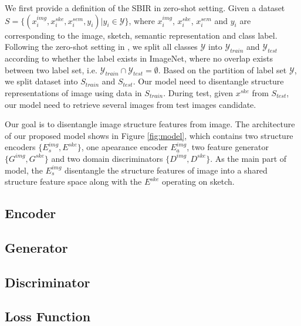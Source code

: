 \documentclass[10pt,twocolumn,letterpaper]{article}
\begin{document}
We first provide a definition of the SBIR in zero-shot setting. Given a dataset $S=\{(x_i^{img}, x_i^{ske}, x_i^{sem}, y_i)|y_i \in \mathcal{Y}\}$, where $x_i^{img}$, $x_i^{ske}$, $x_i^{sem}$ and $y_i$ are corresponding to the image, sketch, semantic representation and class label. Following the zero-shot setting in \cite{yelamarthi2018zero}, we split all classes $\mathcal{Y}$ into $\mathcal{Y}_{train}$ and $\mathcal{Y}_{test}$ according to whether the label exists in ImageNet\cite{deng2009imagenet}, where no overlap exists between two label set, i.e. $\mathcal{Y}_{train} \cap \mathcal{Y}_{test} = \emptyset$. Based on the partition of label set $\mathcal{Y}$, we split dataset into $S_{train}$ and $S_{test}$. Our model need to disentangle structure representations of image using data in $S_{train}$. During test, given $x^{ske}$ from $S_{test}$, our model need to retrieve several images from test images candidate.

Our goal is to disentangle image structure features from image. The architecture of our proposed model shows in Figure \ref{fig:model}, which contains two structure encoders $\{E_{s}^{img}, E^{ske}\}$, one apearance encoder $E^{img}_{a}$, two feature generator $\{G^{img}, G^{ske}\}$ and two domain discriminators $\{D^{img}, D^{ske}\}$. As the main part of model, the $E_{s}^{img}$ disentangle the structure features of image into a shared structure feature space along with the $E^{ske}$ operating on sketch. 

\subsection{Encoder} \label{3.2}

\subsection{Generator} \label{3.3}

\subsection{Discriminator} \label{3.4}

\subsection{Loss Function} \label{3.5}



\end{document}
